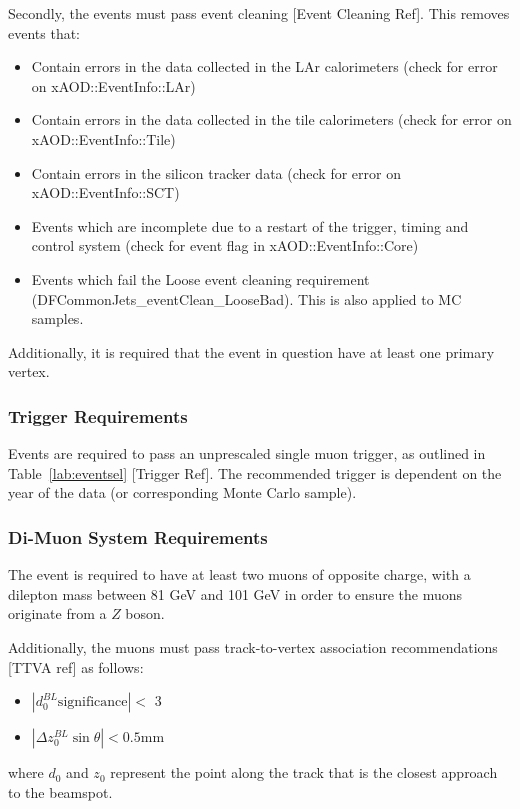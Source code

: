 Secondly, the events must pass event cleaning [Event Cleaning Ref]. This removes events that:
\begin{itemize}
    \item Contain errors in the data collected in the LAr calorimeters (check for error on xAOD::EventInfo::LAr)
    \item Contain errors in the data collected in the tile calorimeters (check for error on xAOD::EventInfo::Tile)
    \item Contain errors in the silicon tracker data (check for error on xAOD::EventInfo::SCT)
    \item Events which are incomplete due to a restart of the trigger, timing and control system (check for event flag in xAOD::EventInfo::Core)
    \item Events which fail the Loose event cleaning requirement (DFCommonJets\_eventClean\_LooseBad). This is also applied to MC samples.
\end{itemize}

Additionally, it is required that the event in question have at least one primary vertex.

\subsubsection{Trigger Requirements}
Events are required to pass an unprescaled single muon trigger, as outlined in Table~\ref{lab:eventsel} [Trigger Ref]. The recommended trigger is dependent on the year of the data (or corresponding Monte Carlo sample).

\subsubsection{Di-Muon System Requirements}
The event is required to have at least two muons of opposite charge, with a dilepton mass between 81 GeV and 101 GeV in order to ensure the muons originate from a $Z$ boson.

Additionally, the muons must pass track-to-vertex association recommendations [TTVA ref] as follows:

\begin{itemize}
    \item $|d_0^{BL}\text{significance}| < $ 3
    \item $|\Delta z_0^{BL}\sin\theta| < 0.5 $mm
\end{itemize}

where $d_0$ and $z_0$ represent the point along the track that is the closest approach to the beamspot.

